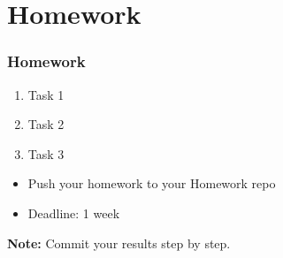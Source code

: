 \documentclass{beamer}
\begin{document}



    

\section{Homework} 

\begin{frame}
    \frametitle{Homework}
    \begin{enumerate}
        \item Task 1
        \item Task 2
        \item Task 3
    \end{enumerate}

    \vskip 2mm
    \begin{itemize}
        \item Push your homework to your Homework repo
        \item Deadline: 1 week %
    \end{itemize}

\vfill
\textbf{Note:} Commit your results step by step.
\end{frame}
\end{document}

